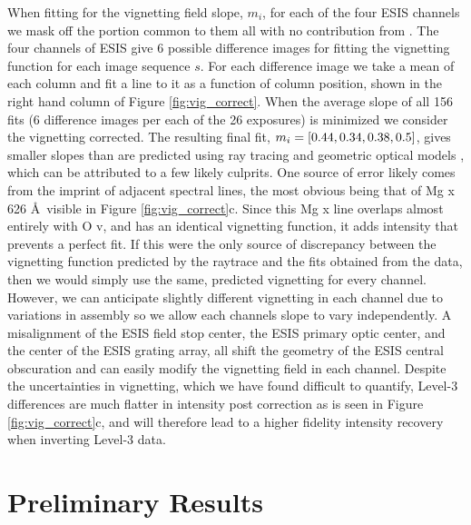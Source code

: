 {\begin{figure}[htb!]
        	\label{fig:mgx_overlap}
        \end{figure}
        
        When fitting for the vignetting field slope, $m_i$, for each  of the four ESIS channels we mask off the portion common to them all with no contribution from \mgxbright.
        The four channels of ESIS give 6 possible difference images for fitting the vignetting function for each image sequence $s$. 
        For each difference image we take a mean of each column and fit a line to it as a function of column position, shown in the right hand column of Figure \ref{fig:vig_correct}.
        When the average slope of all 156 fits (6 difference images per each of the 26 exposures) is minimized we consider the vignetting corrected. 
        The resulting final fit, $m_i = [0.44, 0.34, 0.38, 0.5]$, gives smaller slopes than are predicted using ray tracing and geometric optical models \citep{ESIS}, which can be attributed to a few likely culprits.
        One source of error likely comes from the imprint of adjacent spectral lines, the most obvious being that of Mg {\sc x} 626 \AA \ visible in Figure \ref{fig:vig_correct}c.
        Since this Mg {\sc x} line overlaps almost entirely with O {\sc v}, and has an identical vignetting function, it adds intensity that prevents a perfect fit. 
        If this were the only source of discrepancy between the vignetting function predicted by the raytrace and the fits obtained from the data, then we would simply use the same, predicted vignetting for every channel. 
        However, we can anticipate slightly different vignetting in each channel due to variations in assembly so we allow each channels slope to vary independently.
        A misalignment of the ESIS field stop center, the ESIS primary optic center, and the center of the ESIS grating array, all shift the geometry of the ESIS central obscuration and can easily modify the vignetting field in each channel.
        Despite the uncertainties in vignetting, which we have found difficult to quantify, Level-3 differences are much flatter in intensity post correction as is seen in Figure \ref{fig:vig_correct}c, and will therefore lead to a higher fidelity intensity recovery when inverting Level-3 data.
        

  

\section{Preliminary Results}
	
	
}
